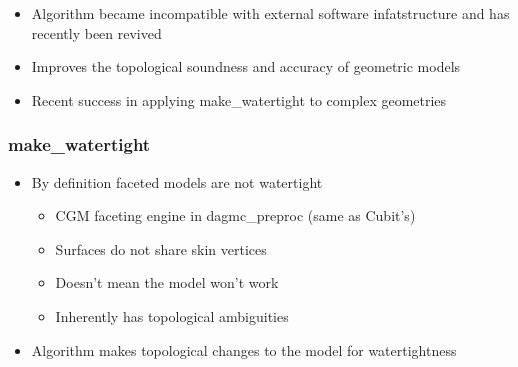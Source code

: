 \documentclass[14pt]{beamer}
\begin{document}
\begin{frame}
\begin{itemize}
\frametitle{make\_watertight}
\item Algorithm became incompatible with external software infatstructure and has recently been revived
\item Improves the topological soundness and accuracy of geometric models
\item Recent success in applying make\_watertight to complex geometries
\end{itemize}
\end{frame}

\begin{frame}
\frametitle{make\_watertight}

\begin{itemize}
\vfill
\item By definition faceted models are not watertight
	\begin{itemize}
	\item CGM faceting engine in dagmc\_preproc (same as Cubit's)
	\item Surfaces do not share skin vertices
	\item Doesn't mean the model won't work
	\item Inherently has topological ambiguities
	\end{itemize}
\vfill
\item Algorithm makes topological changes to the model for watertightness


\end{itemize}
\end{frame}
\end{document}

